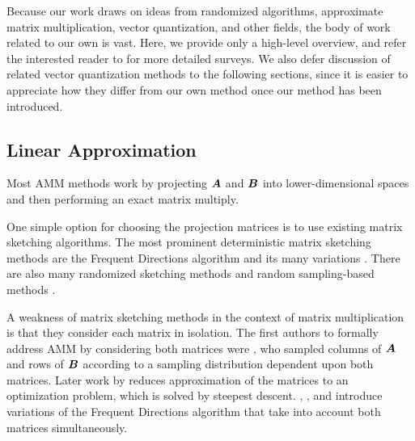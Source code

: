 
Because our work draws on ideas from randomized algorithms, approximate matrix multiplication, vector quantization, and other fields, the body of work related to our own is vast. Here, we provide only a high-level overview, and refer the interested reader to \cite{learningToHashSurvey, hashingSimilaritySurvey, isvd} for more detailed surveys. We also defer discussion of related vector quantization methods to the following sections, since it is easier to appreciate how they differ from our own method once our method has been introduced.

\subsection{Linear Approximation}

Most AMM methods work by projecting $\bm{A}$ and $\bm{B}$ into lower-dimensional spaces and then performing an exact matrix multiply.

One simple option for choosing the projection matrices is to use existing matrix sketching algorithms. The most prominent deterministic matrix sketching methods are the Frequent Directions algorithm \cite{liberty_simple_2012, ghashami_frequent_2016} and its many variations \cite{teng_fast_2019, francis_practical_2018, ye_frequent_2016, huang_near_2019, luo_robust_2019, francis_improvement_2018}. There are also many randomized sketching methods \cite{sarlos_improved_2006, kyrillidis_approximate_2014, pagh_compressed_2013, hashjl,osnap} and random sampling-based methods \cite{drineas_fast_2006-1, drineas_fast_2006-2}.

A weakness of matrix sketching methods in the context of matrix multiplication is that they consider each matrix in isolation. The first authors to formally address AMM by considering both matrices were \citet{drineas_fast_2006}, who sampled columns of $\bm{A}$ and rows of $\bm{B}$ according to a sampling distribution dependent upon both matrices. Later work by \citet{manne_fast_2014} reduces approximation of the matrices to an optimization problem, which is solved by steepest descent. \citet{mroueh_co-occuring_2016}, \citet{ye_frequent_2016}, and \citet{francis_improvement_2018} introduce variations of the Frequent Directions algorithm that take into account both matrices simultaneously.


